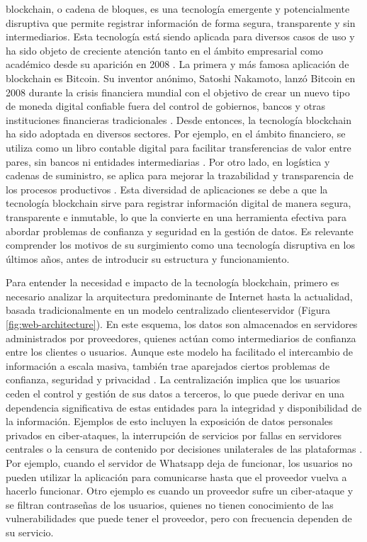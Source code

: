 \Gls{blockchain}, o cadena de bloques, es una tecnología emergente y potencialmente disruptiva que permite registrar información de forma segura, transparente y sin intermediarios. Esta tecnología está siendo aplicada para diversos casos de uso y ha sido objeto de creciente atención tanto en el ámbito empresarial como académico desde su aparición en 2008 \cite{satoshi2008bitcoin}. La primera y más famosa aplicación de blockchain es Bitcoin. Su inventor anónimo, Satoshi Nakamoto, lanzó Bitcoin en 2008 durante la crisis financiera mundial con el objetivo de crear un nuevo tipo de moneda digital confiable fuera del control de gobiernos, bancos y otras instituciones financieras tradicionales \cite{satoshi2008bitcoin}. Desde entonces, la tecnología blockchain ha sido adoptada en diversos sectores. Por ejemplo, en el ámbito financiero, se utiliza como un libro contable digital para facilitar transferencias de valor entre pares, sin bancos ni entidades intermediarias \cite{bulkowska2023implementation}. Por otro lado, en logística y cadenas de suministro, se aplica para mejorar la trazabilidad y transparencia de los procesos productivos \cite{rejeb2023role}. Esta diversidad de aplicaciones se debe a que la tecnología blockchain sirve para registrar información digital de manera segura, transparente e inmutable, lo que la convierte en una herramienta efectiva para abordar problemas de confianza y seguridad en la gestión de datos. Es relevante comprender los motivos de su surgimiento como una tecnología disruptiva en los últimos años, antes de introducir su estructura y funcionamiento.

Para entender la necesidad e impacto de la tecnología blockchain, primero es necesario analizar la arquitectura predominante de Internet hasta la actualidad, basada tradicionalmente en un modelo centralizado \gls{clienteservidor} (Figura \ref{fig:web-architecture}). En este esquema, los datos son almacenados en servidores administrados por proveedores, quienes actúan como intermediarios de confianza entre los clientes o usuarios. Aunque este modelo ha facilitado el intercambio de información a escala masiva, también trae aparejados ciertos problemas de confianza, seguridad y privacidad \cite{gunawan2024review}. La centralización implica que los usuarios ceden el control y gestión de sus datos a terceros, lo que puede derivar en una dependencia significativa de estas entidades para la integridad y disponibilidad de la información. Ejemplos de esto incluyen la exposición de datos personales privados en ciber-ataques, la interrupción de servicios por fallas en servidores centrales o la censura de contenido por decisiones unilaterales de las plataformas \cite{gunawan2024review}. Por ejemplo, cuando el servidor de Whatsapp deja de funcionar, los usuarios no pueden utilizar la aplicación para comunicarse hasta que el proveedor vuelva a hacerlo funcionar. Otro ejemplo es cuando un proveedor sufre un ciber-ataque y se filtran contraseñas de los usuarios, quienes no tienen conocimiento de las vulnerabilidades que puede tener el proveedor, pero con frecuencia dependen de su servicio.

